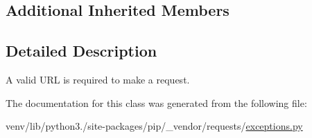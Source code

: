 \subsection*{Additional Inherited Members}


\subsection{Detailed Description}
\begin{DoxyVerb}A valid URL is required to make a request.\end{DoxyVerb}
 

The documentation for this class was generated from the following file\+:\begin{DoxyCompactItemize}
\item 
venv/lib/python3./site-\/packages/pip/\+\_\+vendor/requests/\hyperlink{pip_2__vendor_2requests_2exceptions_8py}{exceptions.\+py}\end{DoxyCompactItemize}
